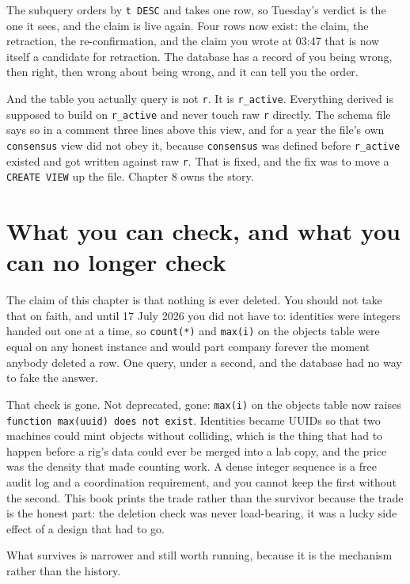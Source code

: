 The subquery orders by \texttt{t DESC} and takes one row, so Tuesday's verdict is the one it sees, and the claim is live again. Four rows now exist: the claim, the retraction, the re-confirmation, and the claim you wrote at 03:47 that is now itself a candidate for retraction. The database has a record of you being wrong, then right, then wrong about being wrong, and it can tell you the order.

And the table you actually query is not \texttt{r}. It is \texttt{r\_active}. Everything derived is supposed to build on \texttt{r\_active} and never touch raw \texttt{r} directly. The schema file says so in a comment three lines above this view, and for a year the file's own \texttt{consensus} view did not obey it, because \texttt{consensus} was defined before \texttt{r\_active} existed and got written against raw \texttt{r}. That is fixed, and the fix was to move a \texttt{CREATE VIEW} up the file. Chapter 8 owns the story.

\section{What you can check, and what you can no longer check}

The claim of this chapter is that nothing is ever deleted. You should not take that on faith, and until 17 July 2026 you did not have to: identities were integers handed out one at a time, so \texttt{count(*)} and \texttt{max(i)} on the objects table were equal on any honest instance and would part company forever the moment anybody deleted a row. One query, under a second, and the database had no way to fake the answer.

That check is gone. Not deprecated, gone: \texttt{max(i)} on the objects table now raises \texttt{function max(uuid) does not exist}. Identities became UUIDs so that two machines could mint objects without colliding, which is the thing that had to happen before a rig's data could ever be merged into a lab copy, and the price was the density that made counting work. A dense integer sequence is a free audit log and a coordination requirement, and you cannot keep the first without the second. This book prints the trade rather than the survivor because the trade is the honest part: the deletion check was never load-bearing, it was a lucky side effect of a design that had to go.

What survives is narrower and still worth running, because it is the mechanism rather than the history.

